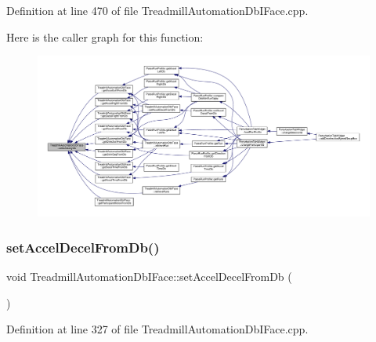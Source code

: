 Definition at line 470 of file Treadmill\+Automation\+Db\+I\+Face.\+cpp.

Here is the caller graph for this function\+:
\nopagebreak
\begin{figure}[H]
\begin{center}
\leavevmode
\includegraphics[width=350pt]{class_treadmill_automation_db_i_face_a4c750844b93ed48c48d76244fa40283e_icgraph}
\end{center}
\end{figure}
\mbox{\label{class_treadmill_automation_db_i_face_ab805c20ce5f736562c3769cdf7a7661b}} 
\subsubsection{\texorpdfstring{set\+Accel\+Decel\+From\+Db()}{setAccelDecelFromDb()}}
{\footnotesize\ttfamily void Treadmill\+Automation\+Db\+I\+Face\+::set\+Accel\+Decel\+From\+Db (\begin{DoxyParamCaption}{ }\end{DoxyParamCaption})}



Definition at line 327 of file Treadmill\+Automation\+Db\+I\+Face.\+cpp.

